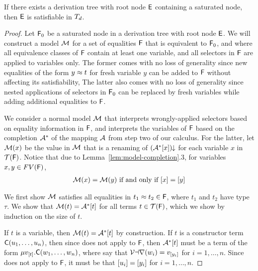 \begin{lemma}%
\label{lem:ss}%
\afterDot
If there exists a derivation tree with root node $\mathsf{E}$ containing a saturated node, then $\mathsf{E}$ is satisfiable in $T_{d}$.
\end{lemma}
\begin{proof}
Let $\mathsf{F}_0$ be a saturated node in a derivation tree with root node $\mathsf{E}$.
We will construct a model $\mathcal{M}$ for a set of equalities $\mathsf{F}$ that is equivalent to $\mathsf{F}_0$, and where 
all equivalence classes of $\mathsf{F}$ contain at least one variable, and all selectors in $\mathsf{F}$ are applied to variables only.
The former comes with no loss of generality since new equalities of the form $y \approx t$ for fresh variable $y$ can be added to $\mathsf{F}$ without affecting its satisfiability,
The latter also comes with no loss of generality since nested applications of selectors in $\mathsf{F}_0$ can be replaced by fresh variables while adding additional equalities to $\mathsf{F}$.

We consider a normal model $\mathcal{M}$ 
that interprets wrongly-applied selectors based on equality information in $\mathsf{F}$,
and interprets the variables of $\mathsf{F}$ based on the completion $\mathcal{A}^\ast$ of the mapping $\mathcal{A}$ from step two of our calculus.
For the latter, let $\mathcal{M}( x )$ be the value in $\mathcal{M}$ that is a renaming of ${(\mathcal{A}^\ast [ x ])}\!\!\downarrow$ for each variable $x$ in $\mathcal{T}(\mathsf{F})$.
Notice that due to Lemma~\ref{lem:model-completion}.3, for variables $x, y \in FV( \mathsf{F} )$,
\begin{eqnarray}
\label{eqn:m-bij} 
\mathcal{M}( x ) = \mathcal{M}( y ) \text{ if and only if } [ x ] = [ y ]
\end{eqnarray}

We first show $\mathcal{M}$ satisfies all equalities in $t_1 \approx t_2 \in \mathsf{F}$, where $t_1$ and $t_2$ have type $\tau$.
We show that $\mathcal{M}( t ) = \mathcal{A}^\ast [ t ]$ for all terms $t \in \mathcal{T}( \mathsf{F} )$, which we show by induction on the size of $t$.

If $t$ is a variable, then $\mathcal{M}( t ) = \mathcal{A}^\ast [  t  ]$ by construction.
If $t$ is a constructor term $\textsf{C}( u_1, \ldots, u_n )$, 
then since  does not apply to $\mathsf{F}$,
then $\mathcal{A}^\ast [ t ]$ must be a term of the form $\mu v_{[ t ]}. \textsf{C}( w_1, \ldots, w_n )$,
where say that $\mathcal{Var}( w_i ) = v_{[ y_i ]}$ for $i = 1, \ldots, n$.
Since  does not apply to $\mathsf{F}$, it must be that $[ u_i ] = [ y_i ]$ for $i = 1, \ldots, n $.



\end{proof}
